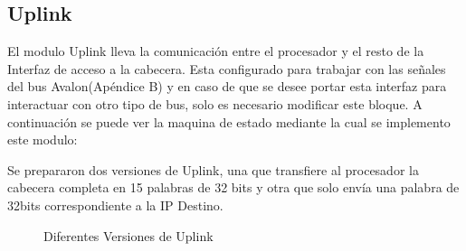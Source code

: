 \subsection{Uplink}
El modulo Uplink lleva la comunicación entre el procesador y el resto de la Interfaz de acceso a la cabecera. Esta configurado para trabajar con las señales del bus Avalon(Apéndice B) y en caso de que se desee portar esta interfaz para interactuar con otro tipo de bus, solo es necesario modificar este bloque. A continuación se puede ver la maquina de estado mediante la cual se implemento este modulo:


Se prepararon dos versiones de Uplink, una que transfiere al procesador la cabecera completa en 15 palabras de 32 bits y otra que solo envía una palabra de 32bits correspondiente a la IP Destino. 

\begin{figure}[H]
  \centering

   \hspace{0.1\linewidth}
  \caption{Diferentes Versiones de Uplink }
  \label{fig:up151}
\end{figure}

